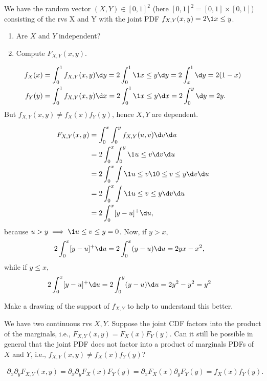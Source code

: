 \begin{exercise}
We have the random vector $(X, Y) \in [0,1]^{2}$ (here $[0,1]^{2} = [0,1]\times [0,1]$) consisting of the rvs X and Y with the joint PDF $f_{X,Y}(x,y) = 2 \1{x\leq y}$.
\begin{enumerate}
\item Are $X$ and $Y$ independent?
\item Compute $F_{X,Y}(x,y)$.
\end{enumerate}
\begin{solution}
\begin{align}
f_{X}(x) &= \int_{0}^{1} f_{X,Y}(x,y) \d y = 2\int_{0}^{1} \1{x\leq y} \d y = 2\int_{x}^{1} \d y = 2(1-x) \\
f_{Y}(y) &= \int_{0}^{1} f_{X,Y}(x,y) \d x = 2\int_{0}^{1} \1{x\leq y} \d x = 2\int_{0}^{y} \d y = 2 y.
\end{align}
But $f_{X,Y}(x,y) \neq f_{X}(x)f_{Y}(y)$, hence $X,Y$ are dependent.

\begin{align}
F_{X,Y}(x,y)
&= \int_{0}^{x}\int_{0}^{y} f_{X,Y}(u,v) \d v \d u \\
&= 2\int_{0}^{x}\int_{0}^{y} \1{u\leq v} \d v \d u \\
&= 2\int_{0}^{x}\int \1{u\leq v} \1{0\leq v \leq y}\d v \d u \\
&= 2\int_{0}^{x}\int  \1{u\leq v \leq y}\d v \d u \\
&= 2\int_{0}^{x} [y-u]^{+} \d u,
\end{align}
because $u > y \implies \1{u\leq v \leq y} = 0$. Now, if $y>x$,
\begin{align}
  2\int_{0}^{x} [y-u]^{+} \d u &=
  2\int_{0}^{x} (y-u) \d u = 2 y x - x^{2},
\end{align}
while if $y\leq x$,
\begin{align}
  2\int_{0}^{x} [y-u]^{+} \d u &=
  2\int_{0}^{y} (y-u) \d u = 2 y^{2} - y^{2} = y^{2}
\end{align}

Make a drawing of the support of $f_{X,Y}$ to help to understand this better.

\end{solution}
\end{exercise}

\begin{exercise}
We have two continuous rvs $X, Y$.
Suppose the joint CDF factors into the product of the marginals, i.e., $F_{X,Y}(x,y) = F_X(x)F_Y(y)$. Can it still be possible in general that the joint PDF does not factor into a product of marginals PDFs of $X$ and $Y$, i.e., $f_{X,Y}(x,y) \neq f_X(x) f_Y(y)$?
\begin{solution}
\begin{align*}
\partial_{x}\partial_{y}F_{X,Y}(x,y)
=\partial_{x}\partial_{y}F_{X}(x) F_{Y}(y)
=\partial_{x}F_{X}(x) \partial_{y} F_{Y}(y) = f_{X}(x) f_{Y}(y).
\end{align*}
\end{solution}
\end{exercise}

